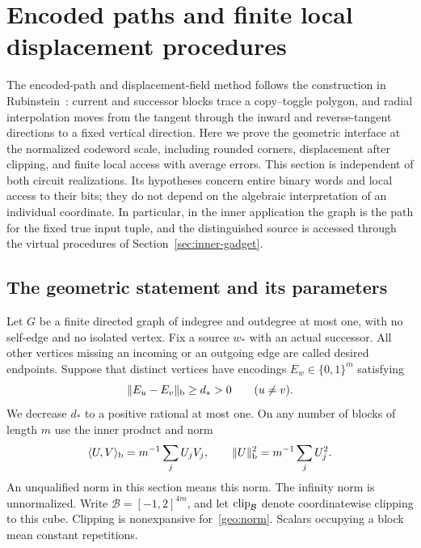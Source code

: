 \section{Encoded paths and finite local displacement procedures}
\label{sec:geometry}

The encoded-path and displacement-field method follows the construction
in Rubinstein~\cite[Sections~3.1--3.2]{Rubinstein2016Settling}: current and successor
blocks trace a copy--toggle polygon, and radial interpolation moves from
the tangent through the inward and reverse-tangent directions to a fixed
vertical direction. Here we prove the geometric interface at the normalized
codeword scale, including rounded corners, displacement after clipping,
and finite local access with average errors. This section is independent
of both circuit realizations. Its hypotheses concern entire binary words and local access
to their bits; they do not depend on the algebraic interpretation of an
individual coordinate. In particular, in the inner application the graph
is the path for the fixed true input tuple, and the distinguished source
is accessed through the virtual procedures of Section~\ref{sec:inner-gadget}.

\subsection{The geometric statement and its parameters}
\label{geo:setup}

Let $G$ be a finite directed graph of indegree and outdegree at most one,
with no self-edge and no isolated vertex. Fix a source $w_*$ with an actual
successor. All other vertices missing an incoming or an outgoing edge are
called desired endpoints. Suppose that distinct vertices have encodings
$E_w\in\{0,1\}^m$ satisfying
\begin{equation}\label{geo:distance}
 \lVert E_u-E_v\rVert_{\rm b}\ge d_*>0\qquad(u\ne v).
\end{equation}
We decrease $d_*$ to a positive rational at most one. On any number of
blocks of length $m$ use the inner product and norm
\begin{equation}\label{geo:norm}
 \langle U,V\rangle_{\rm b}=m^{-1}\sum_j U_jV_j,
 \qquad \lVert U\rVert_{\rm b}^2=m^{-1}\sum_j U_j^2.
\end{equation}
An unqualified norm in this section means this norm. The infinity norm
is unnormalized. Write $\mathcal B=[-1,2]^{4m}$, and let
$\operatorname{clip}_{\mathcal B}$ denote coordinatewise clipping to this cube.
Clipping is nonexpansive for~\eqref{geo:norm}. Scalars occupying a block
mean constant repetitions.

